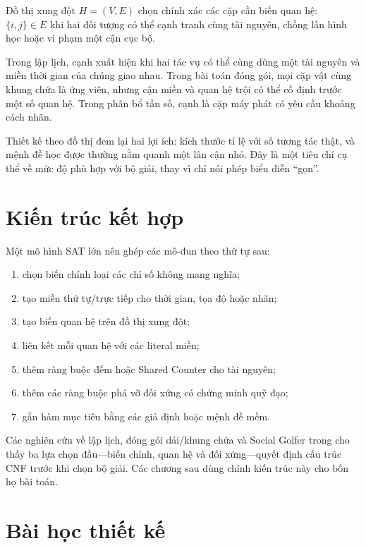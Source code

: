 Đồ thị xung đột \(H=(V,E)\) chọn chính xác các cặp cần biến quan hệ:
\(\{i,j\}\in E\) khi hai đối tượng có thể cạnh tranh cùng tài nguyên, chồng
lấn hình học hoặc vi phạm một cận cục bộ.

Trong lập lịch, cạnh xuất hiện khi hai tác vụ có thể cùng dùng một tài nguyên
và miền thời gian của chúng giao nhau. Trong bài toán đóng gói, mọi cặp vật cùng khung
chứa là ứng viên, nhưng cận miền và quan hệ trội có thể cố định trước một số
quan hệ. Trong phân bổ tần số, cạnh là cặp máy phát có yêu cầu khoảng cách nhãn.

Thiết kế theo đồ thị đem lại hai lợi ích: kích thước tỉ lệ với số tương tác
thật, và mệnh đề học được thường nằm quanh một lân cận nhỏ. Đây là một tiêu chí
cụ thể về mức độ phù hợp với bộ giải, thay vì chỉ nói phép biểu diễn ``gọn''.

\section{Kiến trúc kết hợp}

Một mô hình SAT lớn nên ghép các mô-đun theo thứ tự sau:

\begin{enumerate}
  \item chọn biến chính loại các chỉ số không mang nghĩa;
  \item tạo miền thứ tự/trực tiếp cho thời gian, tọa độ hoặc nhãn;
  \item tạo biến quan hệ trên đồ thị xung đột;
  \item liên kết mỗi quan hệ với các literal miền;
  \item thêm ràng buộc đếm hoặc Shared Counter cho tài nguyên;
  \item thêm các ràng buộc phá vỡ đối xứng có chứng minh quỹ đạo;
  \item gắn hàm mục tiêu bằng các giả định hoặc mệnh đề mềm.
\end{enumerate}

Các nghiên cứu về lập lịch, đóng gói dải/khung chứa và Social Golfer trong
\textcite{kieu2025thesis} cho thấy ba lựa chọn đầu---biến chính, quan hệ và
đối xứng---quyết định cấu trúc CNF trước khi chọn bộ giải. Các chương sau dùng
chính kiến trúc này cho bốn họ bài toán.

\section{Bài học thiết kế}


